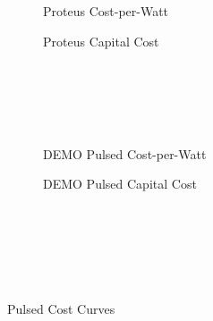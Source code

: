 \begin{figure*}
    \centering
    \hfill
    \begin{subfigure}[t]{0.45\textwidth}
        \centering
		\begin{adjustbox}{width=\textwidth}
			\Large
			
		\end{adjustbox}
        \caption{Proteus Cost-per-Watt}
    \end{subfigure}
    \hfill
    \begin{subfigure}[t]{0.45\textwidth}
        \centering
		\begin{adjustbox}{width=\textwidth}
			\Large
			
		\end{adjustbox}
        \caption{Proteus Capital Cost}
    \end{subfigure}
    \hfill \hfill ~\\ ~\\ ~\\ ~\\
    \hfill
    \begin{subfigure}[t]{0.45\textwidth}
        \centering
		\begin{adjustbox}{width=\textwidth}
			\Large
			
		\end{adjustbox}
        \caption{DEMO Pulsed Cost-per-Watt}
    \end{subfigure}
    \hfill
    \begin{subfigure}[t]{0.45\textwidth}
        \centering
		\begin{adjustbox}{width=\textwidth}
			\Large
			
		\end{adjustbox}
        \caption{DEMO Pulsed Capital Cost}
    \end{subfigure}
    \hfill \hfill ~\\ ~\\ ~\\
    \caption{Pulsed Cost Curves}
    \label{fig:pulsed_costs} ~ \\
\end{figure*}

